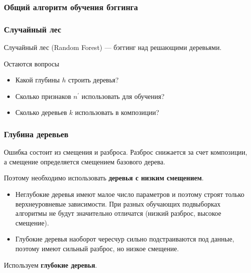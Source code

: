 \documentclass{beamer}
\begin{document}
	\begin{frame}
		\frametitle{Общий алгоритм обучения бэггинга}

		\begin{algorithm}[H]
		   \end{algorithm}
	\end{frame}

	\begin{frame}
		\frametitle{Случайный лес}
		Случайный лес (Random Forest) --- бэггинг над решающими деревьями.

		\vspace{15pt}

		Остаются вопросы
		\begin{itemize}
			\item Какой глубины $h$ строить деревья?
			\item Сколько признаков $n^{'}$ использовать для обучения?
			\item Сколько деревьев $k$ использовать в композиции?
		\end{itemize}
	\end{frame}

	\begin{frame}
		\frametitle{Глубина деревьев}

		Ошибка состоит из смещения и разброса.
		Разброс снижается за счет композиции, а смещение определяется смещением базового дерева.

		Поэтому необходимо использовать \textbf{деревья с низким смещением}.
		\begin{itemize}
			\item Неглубокие деревья имеют малое число параметров и поэтому строят только верхнеуровневые зависимости.
			При разных обучающих подвыборках алгоритмы не будут значительно отличатся (низкий разброс, высокое смещение).
			\item Глубокие деревья наоборот чересчур сильно подстраиваются под данные, поэтому имеют сильный разброс, но низкое смещение.
		\end{itemize}
		\vspace{15pt}

		Используем \textbf{глубокие деревья}.
	\end{frame}
\end{document}
